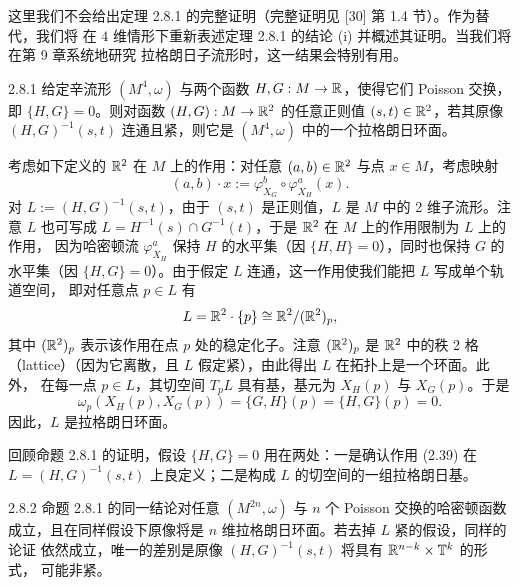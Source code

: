 这里我们不会给出定理 2.8.1 的完整证明（完整证明见 [30] 第 1.4 节）。作为替代，我们将
在
$4$ 维情形下重新表述定理 2.8.1 的结论 (i) 并概述其证明。当我们将在第 9 章系统地研究
拉格朗日子流形时，这一结果会特别有用。

\begin{wprop}{2.8.1}
给定辛流形 $(M^4,\omega)$ 与两个函数 $H,G:M\to\mathbb{R}$，使得它们 Poisson 交换，即
$\{H,G\}=0$。则对函数 $(H,G):M\to\mathbb{R}^2$ 的任意正则值 $(s,t)\in\mathbb{R}^2$，若其原像
$(H,G)^{-1}(s,t)$ 连通且紧，则它是 $(M^4,\omega)$ 中的一个拉格朗日环面。
\end{wprop}

\begin{wproof}
考虑如下定义的 $\mathbb{R}^2$ 在 $M$ 上的作用：对任意 $(a,b)\in\mathbb{R}^2$ 与点 $x\in M$，考虑映射
\begin{equation}
  (a,b)\cdot x:=\varphi_{X_G}^b\circ\varphi_{X_H}^a(x).
  \tag{2.39}
\end{equation}
对 $L:=(H,G)^{-1}(s,t)$，由于 $(s,t)$ 是正则值，$L$ 是 $M$ 中的 2 维子流形。注意 $L$
也可写成 $L=H^{-1}(s)\cap G^{-1}(t)$，于是 $\mathbb{R}^2$ 在 $M$ 上的作用限制为 $L$ 上的作用，
因为哈密顿流 $\varphi_{X_H}^a$ 保持 $H$ 的水平集（因 $\{H,H\}=0$），同时也保持 $G$ 的
水平集（因 $\{H,G\}=0$）。由于假定 $L$ 连通，这一作用使我们能把 $L$ 写成单个轨道空间，
即对任意点 $p\in L$ 有
\[
  L=\mathbb{R}^2\cdot\{p\}\cong\mathbb{R}^2/(\mathbb{R}^2)_p,
\]
其中 $(\mathbb{R}^2)_p$ 表示该作用在点 $p$ 处的稳定化子。注意 $(\mathbb{R}^2)_p$ 是 $\mathbb{R}^2$ 中的秩 2
格（lattice）（因为它离散，且 $L$ 假定紧），由此得出 $L$ 在拓扑上是一个环面。此外，
在每一点 $p\in L$，其切空间 $T_pL$ 具有基，基元为 $X_H(p)$ 与 $X_G(p)$。于是
\[
  \omega_p(X_H(p),X_G(p))=\{G,H\}(p)=\{H,G\}(p)=0 .
\]
因此，$L$ 是拉格朗日环面。
\end{wproof}

回顾命题 2.8.1 的证明，假设 $\{H,G\}=0$ 用在两处：一是确认作用 (2.39) 在
$L=(H,G)^{-1}(s,t)$ 上良定义；二是构成 $L$ 的切空间的一组拉格朗日基。

\begin{wrem}{2.8.2}
命题 2.8.1 的同一结论对任意 $(M^{2n},\omega)$ 与 $n$ 个 Poisson 交换的哈密顿函数
成立，且在同样假设下原像将是 $n$ 维拉格朗日环面。若去掉 $L$ 紧的假设，同样的论证
依然成立，唯一的差别是原像 $(H,G)^{-1}(s,t)$ 将具有 $\mathbb{R}^{n-k}\times\mathbb{T}^k$ 的形式，
可能非紧。
\end{wrem}
